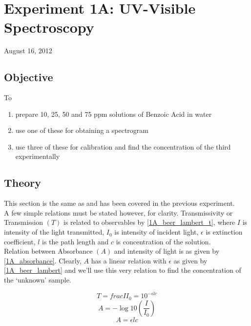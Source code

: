 \chapter{Experiment 1A: UV-Visible Spectroscopy}
\begin{flushright}
August 16, 2012
\end{flushright}

\section{Objective}
	To
	\begin{enumerate}
		\item prepare 10, 25, 50 and 75 ppm solutions of Benzoic Acid in water
		\item use one of these for obtaining a spectrogram
		\item use three of these for calibration and find the concentration of the third experimentally
	\end{enumerate}

\section{Theory}
	This section is the same as and has been covered in the previous experiment.\\
	A few simple relations must be stated however, for clarity. Transmissivity or Transmission $(T)$ is related to observables by \autoref{1A_beer_lambert_t}, where $I$ is intensity of the light transmitted, $I_{0}$ is intensity of incident light, $\epsilon$ is extinction coefficient, $l$ is the path length and $c$ is concentration of the solution.\\
	Relation between Absorbance $(A)$ and intensity of light is as given by \autoref{1A_absorbance}. Clearly, $A$ has a linear relation with $\epsilon$ as given by \autoref{1A_beer_lambert} and we'll use this very relation to find the concentration of the `unknown' sample.
	
	\begin{equation}
		T=frac{I}{I_{0}}=10^{-\epsilon l c}
		\label{1A_beer_lambert_t}
	\end{equation}
	\begin{equation}
		A=-\log{10}(\frac{I}{I_{0}})
		\label{1A_absorbance}
	\end{equation}
	\begin{equation}
		A=\epsilon l c
		\label{1A_beer_lambert}
	\end{equation}
	

